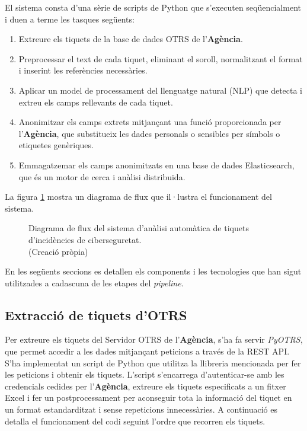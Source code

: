 El sistema consta d'una sèrie de scripts de Python que s'executen seqüencialment i duen a terme les tasques següents:

\begin{enumerate}
     \item Extreure els tiquets de la base de dades OTRS de l'\textbf{Agència}.
     \item Preprocessar el text de cada tiquet, eliminant el soroll, normalitzant el format i inserint les referències necessàries.
     \item Aplicar un model de processament del llenguatge natural (NLP) que detecta i extreu els camps rellevants de cada tiquet.
     \item Anonimitzar els camps extrets mitjançant una funció proporcionada per l'\textbf{Agència}, que substitueix les dades personals o sensibles per símbols o etiquetes genèriques.
     \item Emmagatzemar els camps anonimitzats en una base de dades Elasticsearch, que és un motor de cerca i anàlisi distribuïda.
\end{enumerate}

La figura \ref{fig:pipeline} mostra un diagrama de flux que il·lustra el funcionament del sistema.

\begin{figure}[H]
     \centering
     \vspace{1cm} %
     \setlength{\fboxsep}{5pt} %
     \setlength{\fboxrule}{0pt} %
     \caption{Diagrama de flux del sistema d'anàlisi automàtica de tiquets d'incidències de ciberseguretat. \\ (Creació pròpia)}
     \label{fig:pipeline}
\end{figure}

En les següents seccions es detallen els components i les tecnologies que han sigut utilitzades a cadascuna de les etapes del \textit{pipeline}.
\subsection{Extracció de tiquets d'OTRS}
Per extreure els tiquets del Servidor OTRS de l'\textbf{Agència}, s'ha fa servir \textit{PyOTRS}, que permet accedir a les dades mitjançant peticions a través de la REST API. S'ha implementat un script de Python que utilitza la llibreria mencionada per fer les peticions i obtenir els tiquets. L'script s'encarrega d'autenticar-se amb les credencials cedides per l'\textbf{Agència}, extreure els tiquets especificats a un fitxer Excel i fer un postprocessament per aconseguir tota la informació del tiquet en un format estandarditzat i sense repeticions innecessàries. A continuació es detalla el funcionament del codi seguint l'ordre que recorren els tiquets.

